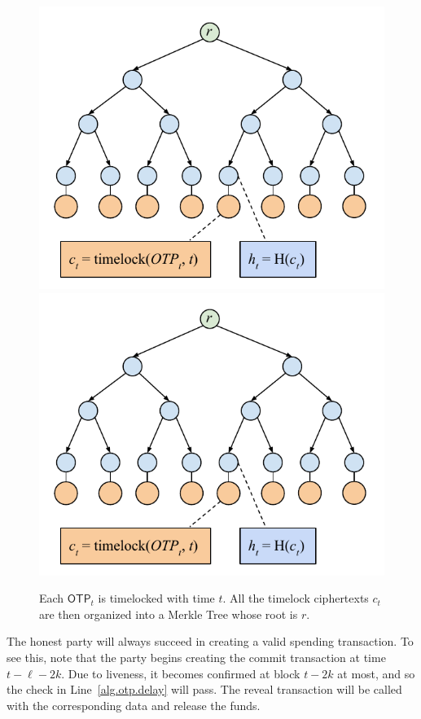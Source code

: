 \begin{figure}[H]
    \caption{Each $\textsf{OTP}_t$ is timelocked with time $t$. All the timelock
             ciphertexts $c_t$ are
             then organized into a Merkle Tree whose root is $r$.}
    \centering
    \ifccs
        \includegraphics[width=\columnwidth,keepaspectratio]{figures/timelock-merkle.pdf}
    \else
        \includegraphics[width=0.7 \columnwidth,keepaspectratio]{figures/timelock-merkle.pdf}
    \fi
    \label{fig.merkle-otp}
\end{figure}

The honest party will always succeed in creating a valid spending transaction.
To see this, note that the party begins creating the commit transaction at time
$t - \ell - 2k$. Due to liveness, it becomes confirmed at block $t - 2k$ at most,
and so the check in Line~\ref{alg.otp.delay} will pass. The reveal transaction will
be called with the corresponding data and release the funds.

